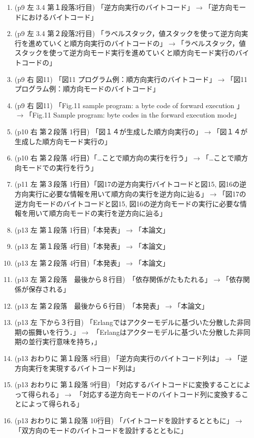 \documentclass[a4j]{jarticle}
\begin{document}
\begin{enumerate}
\item (p9 左 3.4 第１段落3行目) 「逆方向実行のバイトコード」$\rightarrow$「逆方向モードにおけるバイトコード」
\item (p9 左 3.4 第２段落2行目) 「ラベルスタック，値スタックを使って逆方向実行を進めていくと順方向実行のバイトコードの」$\rightarrow$「ラベルスタック，値スタックを使って逆方向モード実行を進めていくと順方向モード実行のバイトコードの」
\item (p9 右 図11) 「図11 プログラム例：順方向実行のバイトコード」$\rightarrow$「図11 プログラム例：順方向モードのバイトコード」
\item (p9 右 図11)  「Fig.11 sample program: a byte code of forward execution 」$\rightarrow$「Fig.11 Sample program: byte codes in the forward execution mode」
\item (p10 右 第２段落 1行目) 「図１４が生成した順方向実行の」$\rightarrow$「図１４が生成した順方向モード実行の」
\item (p10 右 第２段落 4行目）「…ことで順方向の実行を行う」$\rightarrow$「…ことで順方向モードでの実行を行う」
\item (p11 左 第３段落 1行目）「図17の逆方向実行バイトコードと図15, 図16の逆方向実行に必要な情報を用いて順方向の実行を逆方向に辿る」$\rightarrow$「図17の逆方向モードのバイトコードと図15, 図16の逆方向モードの実行に必要な情報を用いて順方向モードの実行を逆方向に辿る」
\item (p13 左 第１段落 1行目)「本発表」$\rightarrow$「本論文」
\item (p13 左 第１段落 4行目)「本発表」$\rightarrow$「本論文」
\item (p13 左 第２段落 4行目)「本発表」$\rightarrow$「本論文」
\item (p13 左 第２段落　最後から８行目)　「依存関係がたもたれる」$\rightarrow$「依存関係が保存される」
\item (p13 左 第２段落　最後から６行目)　「本発表」$\rightarrow$「本論文」
\item (p13 左 下から３行目) 「Erlangではアクターモデルに基づいた分散した非同期の振舞いを行う．」$\rightarrow$
「Erlangはアクターモデルに基づいた分散した非同期の並行実行意味を持ち，」
\item (p13 おわりに 第１段落 8行目) 「逆方向実行のバイトコード列は」$\rightarrow$「逆方向実行を実現するバイトコード列は」
\item (p13 おわりに 第１段落 9行目) 「対応するバイトコードに変換することによって得られる」$\rightarrow$
「対応する逆方向モードのバイトコード列に変換することによって得られる」
\item (p13 おわりに 第１段落 10行目) 「バイトコードを設計するとともに」$\rightarrow$「双方向のモードのバイトコードを設計するとともに」

\end{enumerate}
\end{document}

